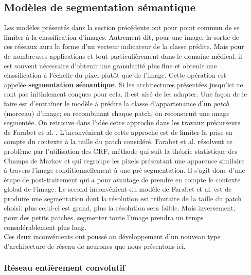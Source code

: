 \subsection{Modèles de segmentation sémantique}
\label{sec:ModeleSegmentation}
Les modèles présentés dans la section précédente ont pour point commun de se limiter à la classification d'images. Autrement dit, pour une image, la sortie de ces réseaux aura la forme d'un vecteur indicateur de la classe prédite. Mais pour de nombreuses applications et tout particulièrement dans le domaine médical, il est souvent nécessaire d'obtenir une granularité plus fine et obtenir une classification à l'échelle du pixel plutôt que de l'image. Cette opération est appelée \textbf{segmentation sémantique}. Si les architectures présentées jusqu'ici ne sont pas initialement conçues pour cela, il est aisé de les adapter. Une façon de le faire est d'entraîner le modèle à prédire la classe d'appartenance d'un \textit{patch} (morceau) d'image; en recombinant chaque patch, on reconstruit une image segmentée. On retrouve dans l'idée cette approche dans les travaux précurseurs de Farabet et al. \cite{farabetLearningHierarchicalFeatures2013}. L'inconvénient de cette approche est de limiter la prise en compte du contexte à la taille du patch considéré. Farabet et al. résolvent ce problème par l'utilisation des \ac{CRF}, méthode qui suit la théorie statistique des Champs de Markov et qui regroupe les pixels présentant une apparence similaire à travers l'image conditionnellement à une pré-segmentation. Il s'agit donc d'une étape de post-traitement qui a pour avantage de prendre en compte le contexte global de l'image. Le second inconvénient du modèle de Farabet et al. est de produire une  segmentation dont la résolution est tributaire de la taille du patch choisi: plus celui-ci est grand, plus la résolution sera faible. Mais inversement, pour des petits patches, segmenter toute l'image prendra un temps considérablement plus long. \\
Ces deux inconvénients ont poussé au développement d'un nouveau type d'architecture de réseau de neurones que nous présentons ici.
\subsubsection{Réseau entièrement convolutif}
\label{sec:FCCN}


